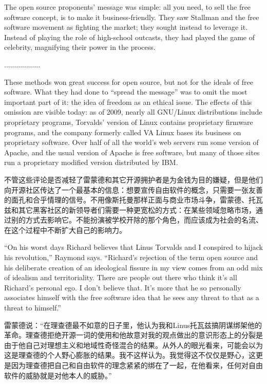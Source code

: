 \ifdefined\eng
The open source proponents' message was simple: all you need, to sell the free software concept, is to make it business-friendly.  They saw Stallman and the free software movement as fighting the market; they sought instead to leverage it. Instead of playing the role of high-school outcasts, they had played the game of celebrity, magnifying their power in the process.
\fi

\ifdefined\chs
..................
\fi

\ifdefined\eng
These methods won great success for open source, but not for the ideals of free software.  What they had done to ``spread the message'' was to omit the most important part of it: the idea of freedom as an ethical issue.  The effects of this omission are visible today: as of 2009, nearly all GNU/Linux distributions include proprietary programs, Torvalds' version of Linux contains proprietary firmware programs, and the company formerly called VA Linux bases its business on proprietary software.  Over half of all the world's web servers run some version of Apache, and the usual version of Apache is free software, but many of those sites run a proprietary modified version distributed by IBM.
\fi

\ifdefined\chs
不管这些评论是否减轻了雷蒙德和其它开源拥护者是为金钱为目的嫌疑，但是他们向开源社区传达了一个最基本的信息：想要宣传自由软件的概念，只需要一张友善的面孔和合乎情理的信号。不用像斯托曼那样正面与商业市场斗争，雷蒙德、托瓦兹和其它黑客社区的新领导者们需要一种更宽松的方式：在某些领域忽略市场，通过别的方式去影响它。不能扮演被学校开除的那个角色，而应该成为社会的名流、在这个过程中不断扩大自己的影响力。
\fi

\ifdefined\eng
``On his worst days Richard believes that Linus Torvalds and I conspired to hijack his revolution,'' Raymond says. ``Richard's rejection of the term open source and his deliberate creation of an ideological fissure in my view comes from an odd mix of idealism and territoriality. There are people out there who think it's all Richard's personal ego. I don't believe that. It's more that he so personally associates himself with the free software idea that he sees any threat to that as a threat to himself.''
\fi

\ifdefined\chs
雷蒙德说：“在理查德最不如意的日子里，他认为我和Linus托瓦兹搞阴谋绑架他的革命。理查德拒绝开源一词的使用和他故意对我的观点做出的意识形态上的分裂是由于他自己对理想主义和地域性奇怪混合的结果。从外人的眼光看来，可能会以为这是理查德的个人野心膨胀的结果。我不这样认为。我觉得这不仅仅是野心，这更是因为理查德把自己和自由软件的理念紧紧的绑在了一起，在他看来，任何对自由软件的威胁就是对他本人的威胁。”
\fi

